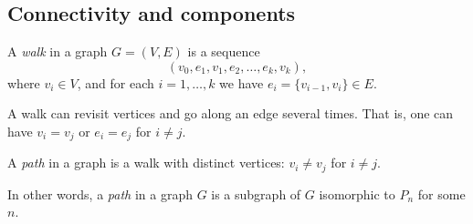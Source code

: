 \begin{page}
\setcounter{section}{1}
\setcounter{subsection}{5}
\setcounter{dfn}{13}
\label{portion:184}

\subsection{Connectivity and components}

\end{page}

\begin{page}
\setcounter{section}{1}
\setcounter{subsection}{5}
\setcounter{dfn}{14}
\label{portion:186}

\begin{dfn}
A \emph{walk} in a graph $G = (V, E)$ is a sequence
\[
(v_0, e_1, v_1, e_2, \ldots, e_k, v_k),
\]
where $v_i \in V$, and for each $i = 1, \ldots, k$ we have $e_i = \{v_{i-1}, v_i\} \in E$.
\end{dfn}

\end{page}

\begin{page}
\setcounter{section}{1}
\setcounter{subsection}{5}
\setcounter{dfn}{15}
\label{portion:189}

\begin{rem}
A walk can revisit vertices and go along an edge several times.
That is, one can have $v_i = v_j$ or $e_i = e_j$ for $i \ne j$.
\end{rem}

\end{page}

\begin{page}
\setcounter{section}{1}
\setcounter{subsection}{5}
\setcounter{dfn}{16}
\label{portion:192}

\begin{dfn}
\label{dfn:PathCycle}
A \emph{path} in a graph is a walk with distinct vertices: $v_i \ne v_j$ for $i \ne j$.
\end{dfn}

\end{page}

\begin{page}
\setcounter{section}{1}
\setcounter{subsection}{5}
\setcounter{dfn}{16}
\label{portion:193}

In other words, a \emph{path} in a graph $G$ is a subgraph of $G$ isomorphic to $P_n$ for some $n$.


\end{page}

